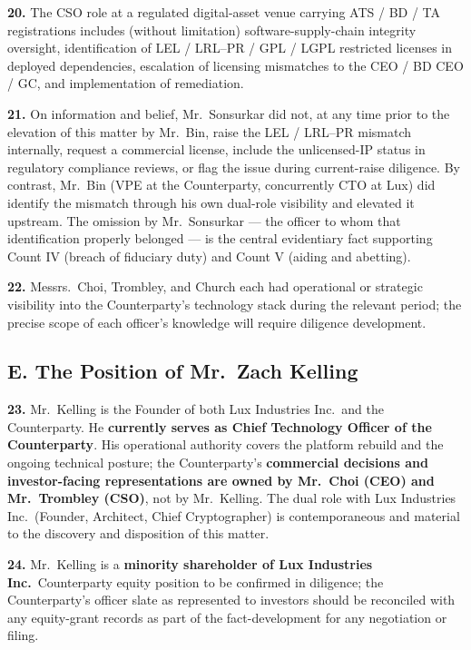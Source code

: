 \documentclass[11pt,letterpaper]{article}
\begin{document}
\textbf{20.} The CSO role at a regulated digital-asset venue
carrying ATS / BD / TA registrations includes (without limitation)
software-supply-chain integrity oversight, identification of LEL /
LRL--PR / GPL / LGPL restricted licenses in deployed dependencies,
escalation of licensing mismatches to the CEO / BD CEO / GC, and
implementation of remediation.

\textbf{21.} On information and belief, Mr.\ Sonsurkar did not, at
any time prior to the elevation of this matter by Mr.\ Bin, raise the
LEL / LRL--PR mismatch internally, request a commercial license,
include the unlicensed-IP status in regulatory compliance reviews, or
flag the issue during current-raise diligence. By contrast, Mr.\ Bin
(VPE at the Counterparty, concurrently CTO at Lux) did identify the
mismatch through his own dual-role visibility and elevated it
upstream. The omission by Mr.\ Sonsurkar --- the officer to whom that
identification properly belonged --- is the central evidentiary fact
supporting Count IV (breach of fiduciary duty) and Count V (aiding
and abetting).

\textbf{22.} Messrs.\ Choi, Trombley, and Church each had operational
or strategic visibility into the Counterparty's technology stack
during the relevant period; the precise scope of each officer's
knowledge will require diligence development.

\subsection*{E. The Position of Mr.\ Zach Kelling}

\textbf{23.} Mr.\ Kelling is the Founder of both Lux Industries
Inc.\ and the Counterparty. He \textbf{currently serves as Chief
Technology Officer of the Counterparty}. His operational authority
covers the platform rebuild and the ongoing technical posture; the
Counterparty's \textbf{commercial decisions and investor-facing
representations are owned by Mr.\ Choi (CEO) and Mr.\ Trombley (CSO)},
not by Mr.\ Kelling. The dual role with Lux Industries Inc.\ (Founder,
Architect, Chief Cryptographer) is contemporaneous and material to the
discovery and disposition of this matter.

\textbf{24.} Mr.\ Kelling is a \textbf{minority shareholder of Lux
Industries Inc.}\ Counterparty equity position to be confirmed in
diligence; the Counterparty's officer slate as represented to
investors should be reconciled with any equity-grant records as part
of the fact-development for any negotiation or filing.
\end{document}
